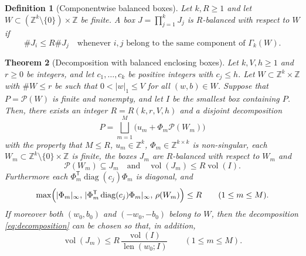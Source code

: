 \documentclass[a4paper,reqno,12pt]{amsart}
\theoremstyle{plain}
\newtheorem{theorem}{Theorem}
\theoremstyle{plain}
\newtheorem{definition}[theorem]{Definition}
\theoremstyle{remark}
\theoremstyle{plain}
\newcommand{\cP}{\mathscr{P}}
\newcommand{\z}{\mathbb{Z}}
\newcommand{\vol}{\operatorname{vol}}
\newcommand{\len}{\operatorname{len}}
\theoremstyle{plain}
\theoremstyle{plain}
\begin{document}
{\begin{definition}[Componentwise balanced boxes]\label{def:balanced-W}
Let $k, R\ge1$ and let $W\subset(\z^k\setminus\{0\})\times\z$ be finite. A box $J=\prod_{j=1}^kJ_j$
is \emph{$R$-balanced with respect to $W$} if
\[
 \#J_i\le R\#J_j
 \quad\text{whenever }i,j\text{ belong to the same component of }
 \Gamma_k(W).
\]
\end{definition}

\begin{theorem}[Decomposition with balanced enclosing boxes]\label{thm:decomp}
Let $k,V,h\ge1$ and $r\ge0$ be integers, and let $c_1,\ldots,c_k$ be positive integers with
$c_j\le h$. Let $W\subset\z^k\times\z$ with $\#W\le r$ be such that $0<|w|_1\le V$ for all $(w,b)\in W$.
Suppose that $P=\cP(W)$ is finite and nonempty, and let $I$ be the smallest box containing $P$.
Then, there exists an integer $R=R(k,r,V,h)$ and a disjoint decomposition
\begin{equation}\label{eq:decomposition}
 P=\bigsqcup_{m=1}^M\bigl(u_m+\Phi_m\cP(W_m)\bigr)
\end{equation}
with the property that $M\le R$, $u_m\in\z^k$, $\Phi_m\in\z^{k\times k}$ is non-singular, each $W_m \subset \z^k \setminus\{0\} \times \z$ is finite, the boxes $J_m$ are $R$-balanced with respect to
$W_m$ and
\begin{equation}\label{eq:boxed-conclusion}
 \cP(W_m)\subseteq J_m \quad \text{and} \quad  \vol(J_m)\le R\vol(I).
\end{equation}
Furthermore each
$\Phi_m^{\mathsf T}\operatorname{diag}(c_j)\Phi_m$ is diagonal, and
\[
\max\Bigl(|\Phi_m|_\infty ,\, |\Phi_m^{\mathsf T}\operatorname{diag}(c_j)\Phi_m|_\infty ,\, \rho(W_m)\Bigr) \leq R
\qquad(1\le m\le M).
\]
If moreover both $(w_0,b_0)$ and $(-w_0,-b_0)$ belong to $W$, then the decomposition
\eqref{eq:decomposition} can be chosen so that, in addition,
\begin{equation}\label{eq:decomposition-section}
 \vol(J_m)\le R\,\frac{\vol(I)}{\len(w_0;I)}\qquad(1\le m\le M).
\end{equation}
\end{theorem}

}
\end{document}
